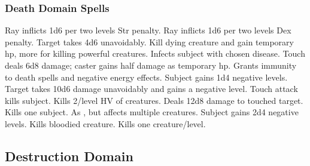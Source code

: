 \subsubsection{Death Domain Spells}
\begin{spelllist}
   Ray inflicts 1d6  per two levels Str penalty.
   Ray inflicts 1d6  per two levels Dex penalty.
   Target takes 4d6 unavoidably.
   Kill dying creature and gain temporary hp, more for killing powerful creatures.
   Infects subject with chosen disease.
   Touch deals 6d8 damage; caster gains half damage as temporary hp.
   Grants immunity to death spells and negative energy effects.
   Subject gains 1d4 negative levels.
   Target takes 10d6 damage unavoidably and gains a negative level.
   Touch attack kills subject.
  \M Kills 2/level HV of creatures.
   Deals 12d8 damage to touched target.
   Kills one subject.
  \spellhead[7]{} 
   As , but affects multiple creatures.
   Subject gains 2d4 negative levels.
   Kills bloodied creature.
   Kills one creature/level.
\end{spelllist}

\subsection{Destruction Domain}

